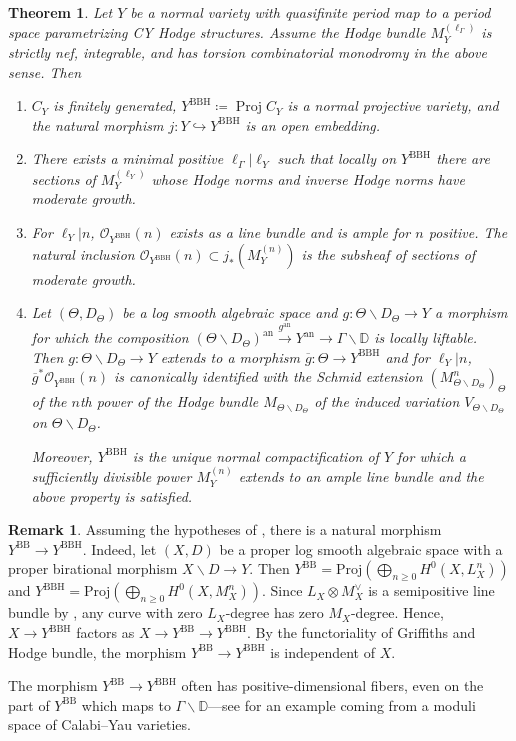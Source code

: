 \documentclass{amsart}
\newcommand{\bs}{\backslash}
\newcommand{\proj}{\operatorname{Proj}}
\newcommand{\an}{\operatorname{an}}
\newcommand{\ol}{\overline}
\newtheorem{thm}[theorem]{Theorem}
\theoremstyle{definition}
\newtheorem{rem}[theorem]{Remark}
\theoremstyle{remark}
\def\bD{\mathbb{D}}
\def\cO{\mathcal{O}}
\def\an{\mathrm{an}}
\def\BB{\mathrm{BB}}
\renewcommand{\bar}[1]{\ol{#1}}
\def\BBH{\mathrm{BBH}}
\numberwithin{equation}{section}
\def\testsp{\Theta}
\begin{document}
\begin{thm}\label{thm:BBHodge}Let $Y$ be a normal variety with quasifinite period map to a period space parametrizing CY Hodge structures.  Assume the Hodge bundle $M_Y^{(\ell_\Gamma)}$ is strictly nef, integrable, and has torsion combinatorial monodromy in the above sense.  Then
\begin{enumerate}

\item $C_Y$ is finitely generated, $Y^{\BBH}\coloneqq  \proj C_Y$ is a normal projective variety, and the natural morphism $j:Y\hookrightarrow Y^{\BBH}$ is an open embedding.

\item There exists a minimal positive $\ell_\Gamma|\ell_Y$ such that locally on $Y^{\BBH}$ there are sections of $M_Y^{(\ell_Y)}$ whose Hodge norms and inverse Hodge norms have moderate growth.

\item 
For $\ell_Y|n$, $\cO_{Y^{\BBH}}(n)$ exists as a line bundle and is ample for $n$ positive.  The natural inclusion $\cO_{Y^\BBH}(n)\subset j_*(M_Y^{(n)})$ is the subsheaf of sections of moderate growth.  
\item Let $(\testsp,D_\testsp)$ be a log smooth algebraic space and $g: \testsp\bs D_\testsp\to Y$ a morphism for which the composition $(\testsp\bs D_\testsp)^\an\xrightarrow{g^\an}Y^\an\to \Gamma\bs \bD$ is locally liftable.  Then $g: \testsp\bs D_\testsp\to Y$ extends to a morphism $\bar g:\testsp\to Y^{\BBH}$ and for $\ell_Y|n$, $\bar g^*\cO_{Y^{\BBH}}(n)$ is canonically identified with the Schmid extension $(M^n_{\testsp\bs D_\testsp})_\testsp$ of the $n$th power of the Hodge bundle $M_{\testsp\bs D_\testsp}$ of the induced variation $ V_{\testsp\bs D_\testsp}$ on $\testsp\bs D_\testsp$.  

 Moreover, $Y^\BBH$ is the unique normal compactification of $Y$ for which a sufficiently divisible power $M_Y^{(n)}$  extends to an ample line bundle and the above property is satisfied.


\end{enumerate}
\end{thm}

\begin{rem}\label{rem:BBtoBBH}Assuming the hypotheses of , there is a natural morphism $Y^\BB\to Y^\BBH$. Indeed, let $(X,D)$ be a proper log smooth algebraic space with a proper birational morphism $X\bs D\to Y$. Then $Y^\BB = \mathrm{Proj}(\bigoplus_{n\geq 0}H^0(X,L_{X}^{n}))$ and $Y^\BBH = \mathrm{Proj}(\bigoplus_{n\geq 0}H^0(X,M_{X}^{n}))$. Since $L_X\otimes M^{\vee}_{X}$ is a semipositive line bundle by , any curve with zero $L_{X}$-degree has zero $M_X$-degree. Hence, $X \to Y^\BBH$ factors as $X \to Y^\BB \to Y^{\BBH}$. By the functoriality of Griffiths and Hodge bundle, the morphism $Y^\BB \to Y^{\BBH}$ is independent of $X$.

The morphism $Y^\BB \to Y^{\BBH}$ often has positive-dimensional fibers, even on the part of $Y^\BB$ which maps to $\Gamma\bs \bD$---see  for an example coming from a moduli space of Calabi--Yau varieties.
\end{rem}
\end{document}
